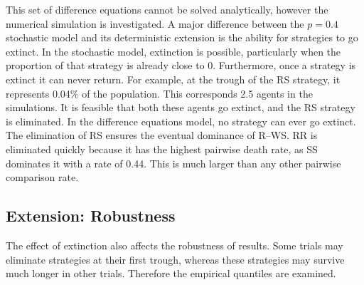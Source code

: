 This set of difference equations cannot be solved analytically, however the numerical simulation is investigated. 
\FloatBarrier
{}
\FloatBarrier
A major difference between the $p=0.4$ stochastic model and its deterministic extension is the ability for strategies to go extinct. In the stochastic model, extinction is possible, particularly when the proportion of that strategy is already close to 0. Furthermore, once a strategy is extinct it can never return. For example, at the trough of the RS strategy, it represents 0.04\% of the population. This corresponds 2.5 agents in the simulations. It is feasible that both these agents go extinct, and the RS strategy is eliminated. In the difference equations model, no strategy can ever go extinct. The elimination of RS ensures the eventual dominance of R--WS. RR is eliminated quickly because it has the highest pairwise death rate, as SS dominates it with a rate of 0.44. This is much larger than any other pairwise comparison rate. 


\subsection{Extension: Robustness} 
The effect of extinction also affects the robustness of results. Some trials may eliminate strategies at their first trough, whereas these strategies may survive much longer in other trials. Therefore the empirical quantiles are examined.

